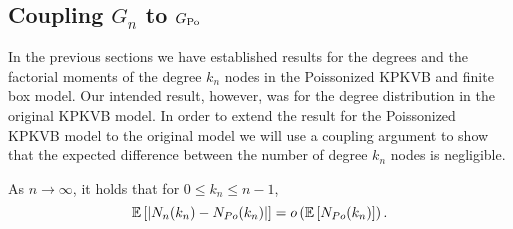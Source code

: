 \subsection{Coupling $G_n$ to $G_{{\mathrm{Po}}}$}\label{ssec:coupling_Gn_GPo}

In the previous sections we have established results for the degrees and the factorial moments of the degree $k_n$ nodes in the Poissonized KPKVB and finite box model. Our intended result, however, was for the degree distribution in the original KPKVB model. In order to extend the result for the Poissonized KPKVB model to the original model we will use a coupling argument to show that the expected difference between the number of degree $k_n$ nodes is negligible.

\begin{lemma}\label{lem:diff_Nk_hyperbolic_binomial_poisson}
As $n \rightarrow \infty$, it holds that for $0 \le k_n \le n - 1$,
\[
\mathbb{E}\left[\left|N_{n}(k_n)-N_{Po}(k_n)\right|\right] = o\left(\mathbb{E}\left[N_{Po}(k_n)\right]\right).
\]
\end{lemma}

